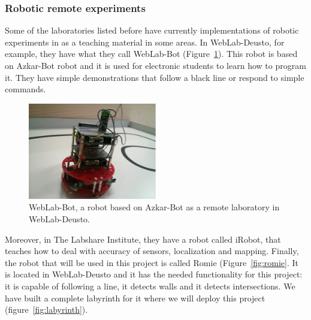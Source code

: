 \subsubsection{Robotic remote experiments}

Some of the laboratories listed before have currently implementations of robotic experiments in
as a teaching material in some areas. In WebLab-Deusto, for example, they have what they call
WebLab-Bot (Figure~\ref{fig:weblab-bot}). This robot is based on Azkar-Bot robot and it is used for
electronic students to learn how to program it. They have simple demonstrations that follow a black
line or respond to simple commands.

\begin{figure}[!htbp]
	\centering
	\includegraphics[width=0.5\textwidth]{fig/weblab-bot}
	\caption{WebLab-Bot, a robot based on Azkar-Bot as a remote laboratory in WebLab-Deusto.}
	\label{fig:weblab-bot}
\end{figure}

Moreover, in The Labshare Institute, they have a robot called iRobot, that teaches how to deal with
accuracy of sensors, localization and mapping. Finally, the robot that will be used in this
project is called Romie (Figure~\ref{fig:romie}. It is located in WebLab-Deusto and it has the
needed functionality for this project: it is capable of following a line, it detects walls and it
detects intersections. We have built a complete labyrinth for it where we will deploy this project
(figure~\ref{fig:labyrinth}).

